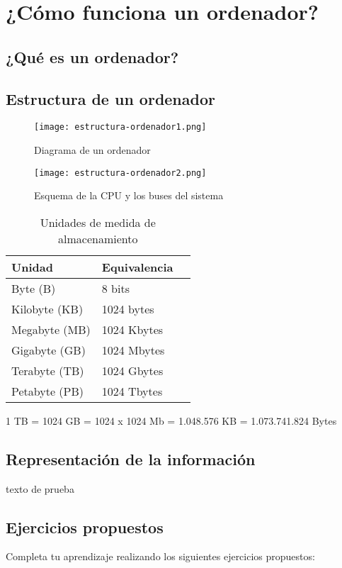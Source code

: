 
\chapter{¿Cómo funciona un ordenador?}

\section{¿Qué es un ordenador?}

\section{Estructura de un ordenador}

\begin{figure}[h]
\centering\texttt{[image: estructura-ordenador1.png]}
\caption{Diagrama de un ordenador}
\label{fig:c1fig1}
\end{figure}

\begin{figure}[h]
\centering\texttt{[image: estructura-ordenador2.png]}
\caption{Esquema de la CPU y los buses del sistema}
\label{fig:c1fig2} 
\end{figure}

\begin{table}[h]
\centering
\begin{tabular}{l l l}
\toprule
\textbf{Unidad} & \textbf{Equivalencia}\\
\midrule
Byte (B) & 8 bits \\
Kilobyte (KB) & 1024 bytes \\
Megabyte (MB) & 1024 Kbytes \\
Gigabyte (GB) & 1024 Mbytes \\
Terabyte (TB) & 1024 Gbytes \\
Petabyte (PB) & 1024 Tbytes \\
\bottomrule
\end{tabular}
\caption{Unidades de medida de almacenamiento}
\label{tab:c1tab1} 
\end{table}

1 TB = 1024 GB = 1024 x 1024 Mb = 1.048.576 KB = 1.073.741.824 Bytes

\section{Representación de la información}

texto de prueba


\section{Ejercicios propuestos}

Completa tu aprendizaje realizando los siguientes ejercicios propuestos:

